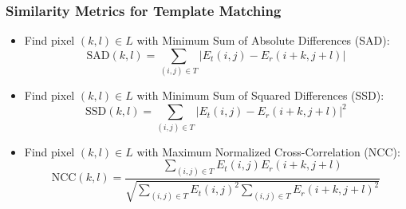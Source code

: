 \begin{frame}
\begin{center}
    \end{center}

\end{frame}


\begin{frame}
    \frametitle{Similarity Metrics for Template Matching}
    \begin{itemize}
        \item Find pixel $(k, l) \in L$ with Minimum Sum of Absolute Differences (SAD):
        \begin{equation*}
            \text{SAD}(k, l) = \sum_{(i, j) \in T} |E_t(i, j) - E_r(i + k, j + l)|
        \end{equation*}

        \item Find pixel $(k, l) \in L$ with Minimum Sum of Squared Differences (SSD):
        \begin{equation*}
            \text{SSD}(k, l) = \sum_{(i, j) \in T} |E_t(i, j) - E_r(i + k, j + l)|^2
        \end{equation*}

        \item Find pixel $(k, l) \in L$ with Maximum Normalized Cross-Correlation (NCC):
        \begin{equation*}
            \text{NCC}(k, l) = \frac{\sum_{(i, j) \in T} E_t(i, j) E_r(i + k, j + l)}{\sqrt{\sum_{(i, j) \in T} E_t(i, j)^2 \sum_{(i, j) \in T} E_r(i + k, j + l)^2}}
        \end{equation*}
    \end{itemize}
\end{frame}


